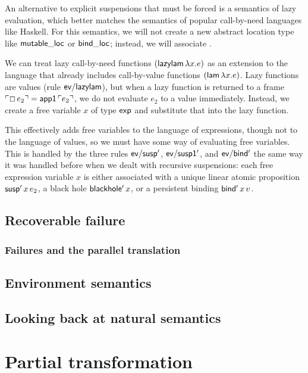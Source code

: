 An alternative to explicit suspensions that must be forced is a
semantics of lazy evaluation, which better matches the semantics of
popular call-by-need languages like Haskell. For this semantics, we
will not create a new abstract location type
like ${\sf mutable\_loc}$ or ${\sf bind\_loc}$; instead, we will 
associate . 

We can treat lazy call-by-need functions $({\sf lazylam}\,\lambda
x.e)$ as an extension to the language that already includes
call-by-value functions $({\sf lam}\,\lambda x.e)$. Lazy functions
are values (rule ${\sf ev/lazylam}$), but when a lazy function
is returned to a frame ${\ulcorner{\Box\,e_2}\urcorner} = {\sf app1}\,{\ulcorner{e_2}\urcorner}$, 
we do not evaluate $e_2$ to a value immediately. Instead, we create
a free variable $x$ of type ${\sf exp}$ and substitute that into 
the lazy function. 

This effectively adds free variables to the language of expressions,
though not to the language of values, so we must have some way of
evaluating free variables. This is handled by the three rules ${\sf
  ev/susp'}$, ${\sf ev/susp1'}$, and ${\sf ev/bind'}$ the same way it
was handled before when we dealt with recursive suspensions: each free
expression variable $x$ is either associated with a unique linear
atomic proposition ${\sf susp'}\,x\,e_2$, a black hole
${\sf blackhole'}\,x$, or a persistent binding ${\sf bind'}\,x\,v$. 

\subsection{Recoverable failure}
\label{sec:failure}

\subsubsection{Failures and the parallel translation}

\subsection{Environment semantics}

\subsection{Looking back at natural semantics}
\label{sec:enriching-natsem}

\section{Partial transformation}
\label{sec:othertransform}

